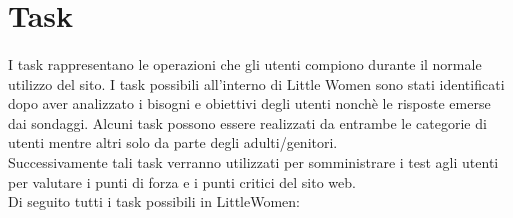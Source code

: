 \documentclass[12pt,a4paper]{report}
\begin{document}
\section{Task}
\paragraph{}I task rappresentano le operazioni che gli utenti compiono durante il normale utilizzo del sito. I task possibili all'interno di Little Women sono stati identificati dopo aver analizzato i bisogni e obiettivi degli utenti nonchè le risposte emerse dai sondaggi. Alcuni task possono essere realizzati da entrambe le categorie di utenti mentre altri solo da parte degli adulti/genitori. \\
Successivamente tali task verranno utilizzati per somministrare i test agli utenti per valutare i punti di forza e i punti critici del sito web.\\
Di seguito tutti i task possibili in LittleWomen:
\end{document}
